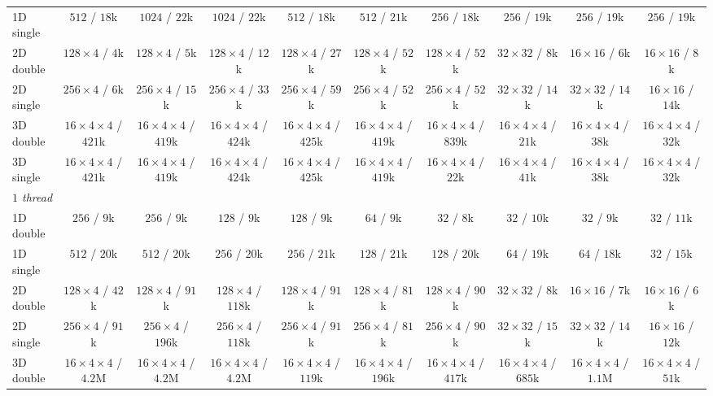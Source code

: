 \begin{table}[p]
{\begin{tabular}{lccccccccc}
        1D single & $512$ / $18$k & $1024$ / $22$k & $1024$ / $22$k & $512$ / $18$k & $512$ / $21$k & $256$ / $18$k & $256$ / $19$k & $256$ / $19$k & $256$ / $19$k \\
        2D double & $128{\times}4$ / $4$k & $128{\times}4$ / $5$k & $128{\times}4$ / $12$k & $128{\times}4$ / $27$k & $128{\times}4$ / $52$k & $128{\times}4$ / $52$k & $32{\times}32$ / $8$k & $16{\times}16$ / $6$k & $16{\times}16$ / $8$k \\
        2D single & $256{\times}4$ / $6$k & $256{\times}4$ / $15$k & $256{\times}4$ / $33$k & $256{\times}4$ / $59$k & $256{\times}4$ / $52$k & $256{\times}4$ / $52$k & $32{\times}32$ / $14$k & $32{\times}32$ / $14$k & $16{\times}16$ / $14$k \\
        3D double & $16{\times}4{\times}4$ / $421$k & $16{\times}4{\times}4$ / $419$k & $16{\times}4{\times}4$ / $424$k & $16{\times}4{\times}4$ / $425$k & $16{\times}4{\times}4$ / $419$k & $16{\times}4{\times}4$ / $839$k & $16{\times}4{\times}4$ / $21$k & $16{\times}4{\times}4$ / $38$k & $16{\times}4{\times}4$ / $32$k \\
        3D single & $16{\times}4{\times}4$ / $421$k & $16{\times}4{\times}4$ / $419$k & $16{\times}4{\times}4$ / $424$k & $16{\times}4{\times}4$ / $425$k & $16{\times}4{\times}4$ / $419$k & $16{\times}4{\times}4$ / $22$k & $16{\times}4{\times}4$ / $41$k & $16{\times}4{\times}4$ / $38$k & $16{\times}4{\times}4$ / $32$k \\
        \midrule
        \multicolumn{10}{l}{\emph{$1$ thread}} \\
        1D double & $256$ / $9$k & $256$ / $9$k & $128$ / $9$k & $128$ / $9$k & $64$ / $9$k & $32$ / $8$k & $32$ / $10$k & $32$ / $9$k & $32$ / $11$k \\
        1D single & $512$ / $20$k & $512$ / $20$k & $256$ / $20$k & $256$ / $21$k & $128$ / $21$k & $128$ / $20$k & $64$ / $19$k & $64$ / $18$k & $32$ / $15$k \\
        2D double & $128{\times}4$ / $42$k & $128{\times}4$ / $91$k & $128{\times}4$ / $118$k & $128{\times}4$ / $91$k & $128{\times}4$ / $81$k & $128{\times}4$ / $90$k & $32{\times}32$ / $8$k & $16{\times}16$ / $7$k & $16{\times}16$ / $6$k \\
        2D single & $256{\times}4$ / $91$k & $256{\times}4$ / $196$k & $256{\times}4$ / $118$k & $256{\times}4$ / $91$k & $256{\times}4$ / $81$k & $256{\times}4$ / $90$k & $32{\times}32$ / $15$k & $32{\times}32$ / $14$k & $16{\times}16$ / $12$k \\
        3D double & $16{\times}4{\times}4$ / $4.2$M & $16{\times}4{\times}4$ / $4.2$M & $16{\times}4{\times}4$ / $4.2$M & $16{\times}4{\times}4$ / $119$k & $16{\times}4{\times}4$ / $196$k & $16{\times}4{\times}4$ / $417$k & $16{\times}4{\times}4$ / $685$k & $16{\times}4{\times}4$ / $1.1$M & $16{\times}4{\times}4$ / $51$k \\

\end{tabular}}
\end{table}
